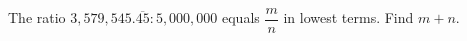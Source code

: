 The ratio $3{,}579{,}545.\overline{45}:5{,}000{,}000$ equals $\dfrac mn$ in lowest terms. Find $m+n$.
